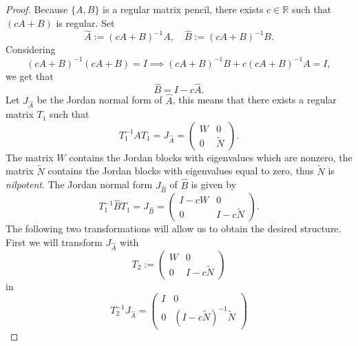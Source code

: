 \begin{proof}
	Because $\{A,B\}$ is a regular matrix pencil, there exists $c \in \mathbb{R}$ such that $(cA+B)$ is regular. Set
	\begin{displaymath}
		\hat{A} := (cA+B)^{-1}A, \quad \hat{B} := (cA+B)^{-1}B.
	\end{displaymath}
	Considering 
	\begin{displaymath}
		(cA+B)^{-1}(cA+B) = I \implies (cA+B)^{-1}B+c(cA+B)^{-1}A = I ,
	\end{displaymath}
	we get that
	\begin{displaymath}
		\hat{B} = I-c \hat{A} .
	\end{displaymath}
	Let $J_ {\hat{A}}$ be the Jordan normal form of $\hat{A}$, this means that there exists a regular matrix $T_1$ such that
	\begin{displaymath}
		T_1^{-1}AT_1 = J_{\hat{A}} =
		\left(
		\begin{matrix}
			W & 0 \\
			0 & \tilde{N} 
		\end{matrix}
		\right) .
	\end{displaymath}
	The matrix $W$ contains the Jordan blocks with eigenvalues which are nonzero, the matrix $\tilde{N}$ contains the Jordan blocks with eigenvalues equal to zero, thus $\tilde{N}$ is \emph{nilpotent}.
	The Jordan normal form $J_{\hat{B}}$ of $\hat{B}$ is given by
	\begin{displaymath}
		T_1^{-1} \hat{B} T_1 = J_{\hat{B}} = 
		\left(
		\begin{matrix}
			I-cW & 0 \\
			0 & I-c\tilde{N}
		\end{matrix}
		\right) .
	\end{displaymath}
	The following two transformations will allow us to obtain the desired structure.
	First we will transform $J_{\hat{A}}$ with
	\begin{displaymath}
		T_2 :=
		\left(
		\begin{matrix}
			W & 0 \\
			0 & I-c\tilde{N}
		\end{matrix}
		\right)
	\end{displaymath}
	in
	\begin{displaymath}
		T_2^{-1}J_{\hat{A}} = 
		\left(
		\begin{matrix}
			I & 0 \\
			0 & (I-c\tilde{N})^{-1}\tilde{N}
		\end{matrix}
		\right)
	\end{displaymath}

\end{proof}
